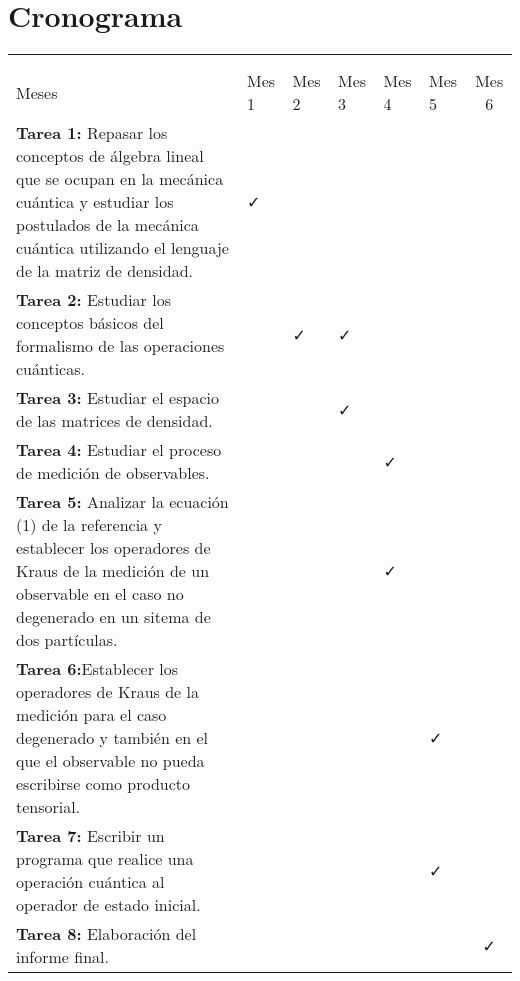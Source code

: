\section{Cronograma}


\begin{table}[H]
	\begin{center}
		
	\begin{tabular}{|>{\arraybackslash}m{6cm}|>{\centering}m{1cm}|>{\centering}m{1cm}|>{\centering}m{1cm}|>{\centering}m{1cm}|>{\centering}m{1cm}|c|}
		\hline
		
		\diagbox[width=18em]{  Tareas\\ }{ \\ Meses}&
		 Mes 1& Mes 2&Mes 3&Mes 4 &Mes 5&Mes 6 \\ \hline \hline
		\textbf{Tarea 1:} Repasar los conceptos de álgebra lineal que se ocupan en la mecánica cuántica y estudiar los postulados de la mecánica cuántica utilizando el lenguaje de la matriz de densidad.&\faCheck & & & & & \\ \hline
		\textbf{Tarea 2:} Estudiar los conceptos básicos del formalismo de las operaciones cuánticas.&&\faCheck&\faCheck&&& \\ \hline
		\textbf{Tarea 3:} Estudiar el espacio de las matrices de densidad.&&&\faCheck&&&\\ \hline
		\textbf{Tarea 4:} Estudiar el proceso de medición de observables. &                          & &  & \faCheck &  &                          \\ \hline
		\textbf{Tarea 5:} Analizar la ecuación (1) de la referencia \cite{Pineda_2021} y establecer los operadores de Kraus de la medición de un observable en el caso no degenerado en un sitema de dos partículas. &                          &  & &\faCheck   &  &                          \\ \hline
		\textbf{Tarea 6:}Establecer los operadores de Kraus de la medición para el caso degenerado y también en el que el observable no pueda escribirse como producto tensorial.&                          &                          &  & &\faCheck   &                          \\ \hline
		\textbf{Tarea 7:} Escribir un programa que realice una operación cuántica al operador de estado inicial. &                          &                          &  &  & \faCheck &                          \\ \hline
		\textbf{Tarea 8:} Elaboración del informe final.&                          &                          &  &  &  &\faCheck  \\ \hline
	\end{tabular}

	\end{center}

\end{table}